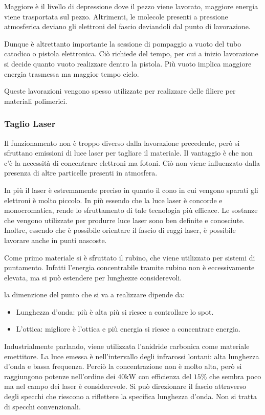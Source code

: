 Maggiore è il livello di depressione dove il pezzo viene lavorato, maggiore energia viene trasportata sul pezzo. Altrimenti, le molecole presenti a pressione atmosferica deviano gli elettroni del fascio deviandoli dal punto di lavorazione.

Dunque è altrettanto importante la sessione di pompaggio a vuoto del tubo catodico o pistola elettronica. Ciò richiede del tempo, per cui a inizio lavorazione si decide quanto vuoto realizzare dentro la pistola. Più vuoto implica maggiore energia trasmessa ma maggior tempo ciclo.

Queste lavorazioni vengono spesso utilizzate per realizzare delle filiere per materiali polimerici.

\subsubsection{Taglio Laser}
Il funzionamento non è troppo diverso dalla lavorazione precedente, però si sfruttano emissioni di luce laser per tagliare il materiale.
Il vantaggio è che non c'è la necessità di concentrare elettroni ma fotoni.
Ciò non viene influenzato dalla presenza di altre particelle presenti in atmosfera.

In più il laser è estremamente preciso in quanto il cono in cui vengono sparati gli elettroni è molto piccolo.
In più essendo che la luce laser è concorde e monocromatica, rende lo sfruttamento di tale tecnologia più efficace.
Le sostanze che vengono utilizzate per produrre luce laser sono ben definite e conosciute.
Inoltre, essendo che è possibile orientare il fascio di raggi laser, è possibile lavorare anche in punti nascoste.

Come primo materiale si è sfruttato il rubino, che viene utilizzato per sistemi di puntamento. Infatti l'energia concentrabile tramite rubino non è eccessivamente elevata, ma si può estendere per lunghezze considerevoli.

la dimenzione del punto che si va a realizzare dipende da:
\begin{itemize}
\item Lunghezza d'onda: più è alta più si riesce a controllare lo spot.
\item L'ottica: migliore è l'ottica e più energia si riesce a concentrare energia.
\end{itemize}
Industrialmente parlando, viene utilizzata l'anidride carbonica come materiale emettitore. La luce emessa è nell'intervallo degli infrarossi lontani: alta lunghezza d'onda e bassa frequenza.
Perciò la concentrazione non è molto alta, però si raggiungono potenze nell'ordine dei $40\unit{\kW}$ con efficienza del $15\%$ che sembra poco ma nel campo dei laser è considerevole.
Si può direzionare il fascio attraverso degli specchi che riescono a riflettere la specifica lunghezza d'onda. Non si tratta di specchi convenzionali.

